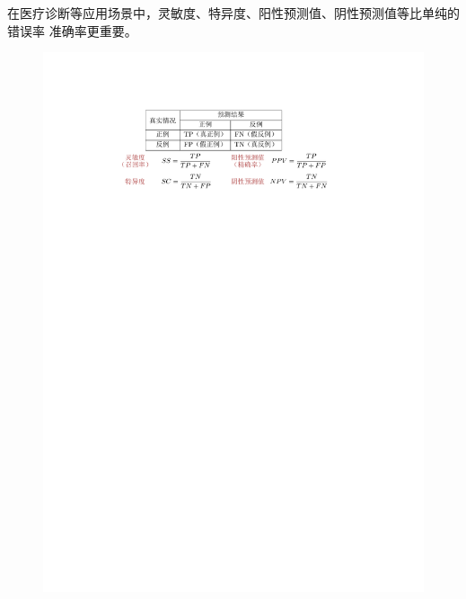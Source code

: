 \begin{note}
    在医疗诊断等应用场景中，\textcolor{main1}{灵敏度、特异度、阳性预测值、阴性预测值}等比单纯的错误率 准确率更重要。
    \begin{figure}[htbp]
        \centering
        \includegraphics{image/决策树.pdf}
    \end{figure}
\end{note}
